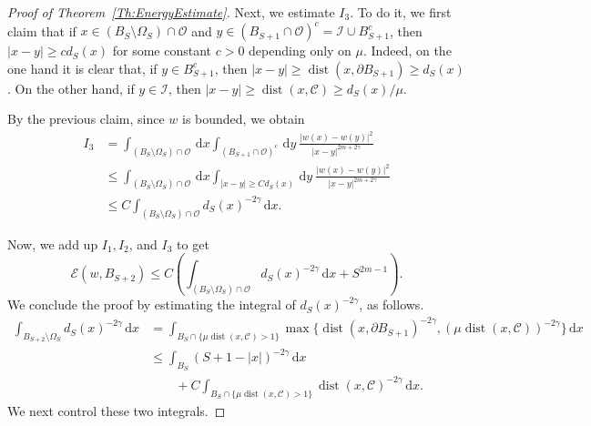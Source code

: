 \documentclass[12pt,reqno]{amsart}
\theoremstyle{definition}
\theoremstyle{remark}
\newcommand{\ccal}{\mathscr{C}}
\newcommand{\ecal}{\mathcal{E}}
\newcommand{\ical}{\mathcal{I}}
\newcommand{\ocal}{\mathcal{O}}
\newcommand{\s}{\gamma}
\renewcommand{\d}{\,\mathrm{d}} %
\DeclareMathOperator{\dist}{dist}
\numberwithin{equation}{section}
\begin{document}
\begin{proof}[Proof of Theorem~\ref{Th:EnergyEstimate}]
	Next, we estimate $I_3$. To do it, we first claim that if $x\in (B_S\setminus \Omega_S) \cap \ocal$ and $y\in (B_{S+1}\cap \ocal)^c = \ical \cup B_{S+1}^c$, then $|x-y|\geq c d_S(x)$ for some constant $c>0$ depending only on $\mu$. Indeed, on the one hand it is clear that, if $y\in B_{S+1}^c$, then $|x-y|\geq \dist(x,\partial B_{S+1})\geq d_S(x)$. On the other hand, if $y\in \ical$, then $|x-y|\geq \dist(x,\ccal) \geq  d_S(x) / \mu$.
	
	By the previous claim, since $w$ is bounded, we obtain
	\begin{align*}
	I_3 &= \int_{(B_S\setminus \Omega_S)\cap \ocal} \d x \int_{(B_{S+1}\cap \ocal)^c} \d y \  \frac{|w(x)-w(y)|^2}{|x-y|^{2m+2\s}} \\
	&\leq \int_{(B_S\setminus \Omega_S)\cap \ocal} \d x \int_{|x-y|\geq C d_S(x)} \d y \ \frac{|w(x)-w(y)|^2}{|x-y|^{2m+2\s}} \\
	&\leq C \int_{(B_S\setminus \Omega_S)\cap \ocal}  d_S(x)^{-2\s} \d x .
	\end{align*}
	
	Now, we add up $I_1, I_2$, and $I_3$ to get
	\begin{equation}
	\label{Eq:EnergyEstimateProofLastEstimate}
	\ecal(w,B_{S+2}) \leq C \left( \int_{(B_S\setminus \Omega_S)\cap \ocal}  d_S(x)^{-2\s} \d x + S^{2m-1}\right).
	\end{equation}
	We conclude the proof by estimating the integral of $d_S(x)^{-2\s}$, as follows.
	\begin{equation}
	\label{Eq:EnergyEstimatedS}
	\begin{split}
	\int_{B_{S+2}\setminus \Omega_S} d_S(x)^{-2\s} \d x &= \int_{B_{S}\cap \{\mu \dist(x,\ccal)>1\}} \!\!\!\! \max\{\dist(x,\partial B_{S+1})^{-2\s}, (\mu\dist(x,\ccal))^{-2\s}\} \d x \\
	& \leq \int_{B_S} \left( S+1-|x| \right)^{-2\s} \d x \\
	& \quad \quad + C \int_{B_{S}\cap \{\mu \dist(x,\ccal)>1\}} \dist(x,\ccal)^{-2\s} \d x.
	\end{split}
		\end{equation}
	We next control these two integrals.
	

\end{proof}
\end{document}

